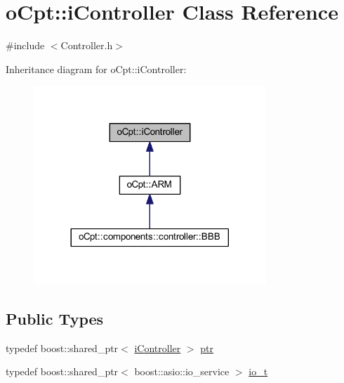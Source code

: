 \hypertarget{classo_cpt_1_1i_controller}{}\section{o\+Cpt\+:\+:i\+Controller Class Reference}
\label{classo_cpt_1_1i_controller}


{\ttfamily \#include $<$Controller.\+h$>$}



Inheritance diagram for o\+Cpt\+:\+:i\+Controller\+:
\nopagebreak
\begin{figure}[H]
\begin{center}
\leavevmode
\includegraphics[width=248pt]{classo_cpt_1_1i_controller__inherit__graph}
\end{center}
\end{figure}
\subsection*{Public Types}
\begin{DoxyCompactItemize}
\item 
typedef boost\+::shared\+\_\+ptr$<$ \hyperlink{classo_cpt_1_1i_controller}{i\+Controller} $>$ \hyperlink{classo_cpt_1_1i_controller_a6d89a95cd6ad68bb74adfaca2f36370f}{ptr}
\item 
typedef boost\+::shared\+\_\+ptr$<$ boost\+::asio\+::io\+\_\+service $>$ \hyperlink{classo_cpt_1_1i_controller_a51c3436b03060209f6cd2ddce6df2d0c}{io\+\_\+t}
\end{DoxyCompactItemize}
